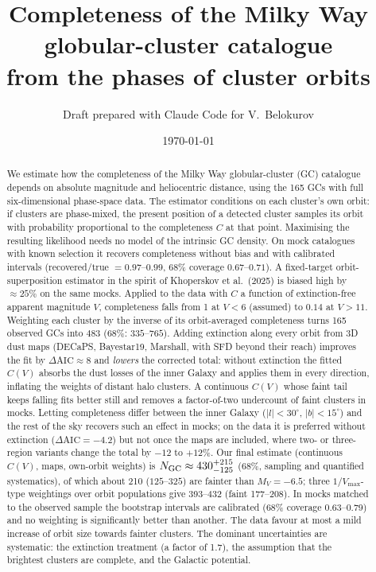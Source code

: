 \documentclass[11pt,a4paper]{article}
\title{Completeness of the Milky Way globular-cluster catalogue\\from the phases of cluster orbits}
\author{Draft prepared with Claude Code for V.~Belokurov}
\date{\today}
\newcommand{\MV}{M_V}
\begin{document}
\maketitle

\begin{abstract}
We estimate how the completeness of the Milky Way globular-cluster (GC) catalogue depends on
absolute magnitude and heliocentric distance, using the 165 GCs with full six-dimensional phase-space
data. The estimator conditions on each cluster's own orbit: if clusters are phase-mixed, the
present position of a detected cluster samples its orbit with probability proportional to the
completeness $C$ at that point. Maximising the resulting likelihood needs no model of the
intrinsic GC density. On mock catalogues with known selection it recovers completeness without bias
and with calibrated intervals (recovered/true $=0.97$--$0.99$, 68\% coverage $0.67$--$0.71$). A
fixed-target orbit-superposition estimator in the spirit of Khoperskov et al.\ (2025) is biased high
by $\approx 25\%$ on the same mocks. Applied to the data with $C$ a function of
extinction-free apparent magnitude $V$, completeness falls from 1 at $V<6$ (assumed) to $0.14$ at
$V>11$. Weighting each cluster by the inverse of its orbit-averaged completeness turns 165 observed
GCs into $483$ ($68\%$: $335$--$765$). Adding extinction along every orbit from 3D dust maps
(DECaPS, Bayestar19, Marshall, with SFD beyond their reach) improves the fit by
$\Delta\mathrm{AIC}\approx 8$ and \emph{lowers} the corrected total: without extinction the fitted
$C(V)$ absorbs the dust losses of the inner Galaxy and applies them in every direction, inflating the
weights of distant halo clusters. A continuous $C(V)$ whose faint tail keeps falling fits better
still and removes a factor-of-two undercount of faint clusters in mocks. Letting completeness differ
between the inner Galaxy ($|l|<30^\circ$, $|b|<15^\circ$) and the rest of the sky recovers such an effect
in mocks; on the data it is preferred without extinction ($\Delta\mathrm{AIC}=-4.2$) but not once the
maps are included, where two- or three-region variants change the total by $-12$ to $+12\%$. Our final estimate (continuous
$C(V)$, maps, own-orbit weights) is $N_{\rm GC}\approx430^{+215}_{-125}$ (68\%, sampling and quantified
systematics), of which about 210 ($125$--$325$) are fainter than $\MV=-6.5$; three $1/V_{\max}$-type weightings over orbit populations give 393--432 (faint 177--208). In
mocks matched to the observed sample the bootstrap intervals are calibrated (68\% coverage
0.63--0.79) and no weighting is significantly better than another. The data favour at most a mild
increase of orbit size towards fainter clusters. The dominant uncertainties are systematic: the
extinction treatment (a factor of 1.7), the assumption that the brightest clusters are complete, and
the Galactic potential.
\end{abstract}
\end{document}
